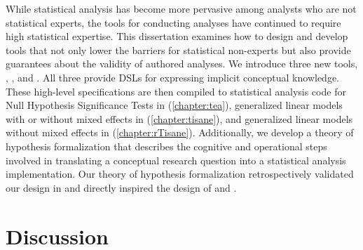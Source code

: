 
While statistical analysis has become more pervasive among analysts who are not
statistical experts, the tools for conducting analyses have continued to require
high statistical expertise. This dissertation examines how to design and develop
tools that not only lower the barriers for statistical non-experts but also
provide guarantees about the validity of authored analyses. We introduce three
new tools, \tea, \tisane, and \rTisane. All three provide DSLs for expressing
implicit conceptual knowledge. These high-level specifications are then compiled
to statistical analysis code for Null Hypothesis Significance Tests in \tea
(\autoref{chapter:tea}), generalized linear models with or without mixed effects
in \tisane (\autoref{chapter:tisane}), and generalized linear models without
mixed effects in \rTisane (\autoref{chapter:rTisane}).
Additionally, we develop a theory of hypothesis formalization that describes the
cognitive and operational steps involved in translating a conceptual research
question into a statistical analysis implementation. Our theory of hypothesis
formalization retrospectively validated our design in \tea and directly inspired
the design of \tisane and \rTisane. 


\section{Discussion} \label{sec:discussionChallenges} 


